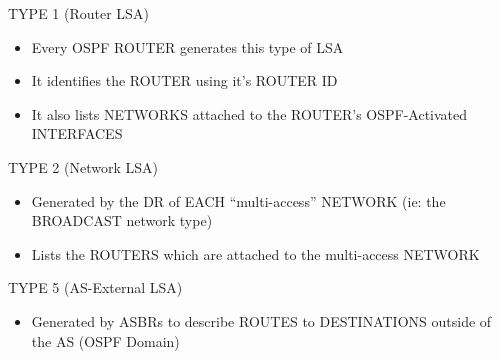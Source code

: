TYPE 1 (Router LSA)

\begin{itemize}
\tightlist
\item
  Every OSPF ROUTER generates this type of LSA
\item
  It identifies the ROUTER using it's ROUTER ID
\item
  It also lists NETWORKS attached to the ROUTER's OSPF-Activated
  INTERFACES
\end{itemize}

TYPE 2 (Network LSA)

\begin{itemize}
\tightlist
\item
  Generated by the DR of EACH ``multi-access'' NETWORK (ie: the
  BROADCAST network type)
\item
  Lists the ROUTERS which are attached to the multi-access NETWORK
\end{itemize}

TYPE 5 (AS-External LSA)

\begin{itemize}
\tightlist
\item
  Generated by ASBRs to describe ROUTES to DESTINATIONS outside of the
  AS (OSPF Domain)
\end{itemize}
